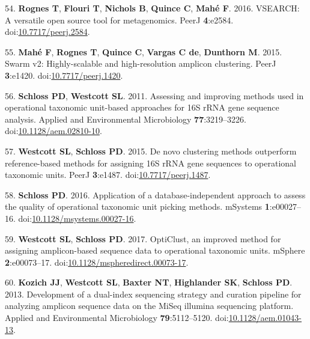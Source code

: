 \documentclass[11pt,]{article}
\begin{document}
\leavevmode\hypertarget{ref-Rognes2016}{}%
54. \textbf{Rognes T}, \textbf{Flouri T}, \textbf{Nichols B},
\textbf{Quince C}, \textbf{Mahé F}. 2016. VSEARCH: A versatile open
source tool for metagenomics. PeerJ \textbf{4}:e2584.
doi:\href{https://doi.org/10.7717/peerj.2584}{10.7717/peerj.2584}.

\leavevmode\hypertarget{ref-Mah2015}{}%
55. \textbf{Mahé F}, \textbf{Rognes T}, \textbf{Quince C},
\textbf{Vargas C de}, \textbf{Dunthorn M}. 2015. Swarm v2:
Highly-scalable and high-resolution amplicon clustering. PeerJ
\textbf{3}:e1420.
doi:\href{https://doi.org/10.7717/peerj.1420}{10.7717/peerj.1420}.

\leavevmode\hypertarget{ref-Schloss2011a}{}%
56. \textbf{Schloss PD}, \textbf{Westcott SL}. 2011. Assessing and
improving methods used in operational taxonomic unit-based approaches
for 16S rRNA gene sequence analysis. Applied and Environmental
Microbiology \textbf{77}:3219--3226.
doi:\href{https://doi.org/10.1128/aem.02810-10}{10.1128/aem.02810-10}.

\leavevmode\hypertarget{ref-Westcott2015}{}%
57. \textbf{Westcott SL}, \textbf{Schloss PD}. 2015. De novo clustering
methods outperform reference-based methods for assigning 16S rRNA gene
sequences to operational taxonomic units. PeerJ \textbf{3}:e1487.
doi:\href{https://doi.org/10.7717/peerj.1487}{10.7717/peerj.1487}.

\leavevmode\hypertarget{ref-Schloss2016a}{}%
58. \textbf{Schloss PD}. 2016. Application of a database-independent
approach to assess the quality of operational taxonomic unit picking
methods. mSystems \textbf{1}:e00027--16.
doi:\href{https://doi.org/10.1128/msystems.00027-16}{10.1128/msystems.00027-16}.

\leavevmode\hypertarget{ref-Westcott2017}{}%
59. \textbf{Westcott SL}, \textbf{Schloss PD}. 2017. OptiClust, an
improved method for assigning amplicon-based sequence data to
operational taxonomic units. mSphere \textbf{2}:e00073--17.
doi:\href{https://doi.org/10.1128/mspheredirect.00073-17}{10.1128/mspheredirect.00073-17}.

\leavevmode\hypertarget{ref-Kozich2013}{}%
60. \textbf{Kozich JJ}, \textbf{Westcott SL}, \textbf{Baxter NT},
\textbf{Highlander SK}, \textbf{Schloss PD}. 2013. Development of a
dual-index sequencing strategy and curation pipeline for analyzing
amplicon sequence data on the MiSeq illumina sequencing platform.
Applied and Environmental Microbiology \textbf{79}:5112--5120.
doi:\href{https://doi.org/10.1128/aem.01043-13}{10.1128/aem.01043-13}.
\end{document}
